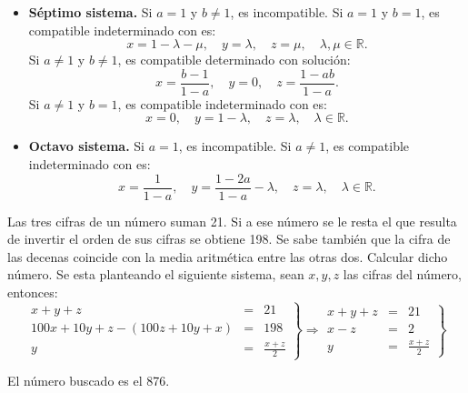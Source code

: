\begin{ejercicio}
\begin{itemize}
		\item \textbf{Séptimo sistema.} Si $a = 1$ y $b \neq 1$, es incompatible. Si $a = 1$ y $b = 1$, es compatible indeterminado con es:
		      \[
			      x = 1 - \lambda - \mu, \quad y = \lambda, \quad z = \mu, \quad \lambda, \mu \in \mathbb{R}.
		      \]
		      Si $a \neq 1$ y $b \neq 1$, es compatible determinado con solución:
		      \[
			      x = \frac{b - 1}{1 - a}, \quad y = 0, \quad z = \frac{1 - ab}{1 - a}.
		      \]
		      Si $a \neq 1$ y $b = 1$, es compatible indeterminado con es:
		      \[
			      x = 0, \quad y = 1 - \lambda, \quad z = \lambda, \quad \lambda \in \mathbb{R}.
		      \]

		\item \textbf{Octavo sistema.} Si $a = 1$, es incompatible. Si $a \neq 1$, es compatible indeterminado con es:
		      \[
			      x = \frac{1}{1 - a}, \quad y = \frac{1 - 2a}{1 - a} - \lambda, \quad z = \lambda, \quad \lambda \in \mathbb{R}.
		      \]
	\end{itemize}


\end{ejercicio}
\begin{ejercicio}
	Las tres cifras de un número suman 21. Si a ese número se le resta el que resulta de invertir el orden de sus cifras se obtiene 198. Se sabe también que la cifra de las decenas coincide con la media aritmética entre las otras dos. Calcular dicho número.
	Se esta planteando el siguiente sistema, sean $x, y, z$ las cifras del número, entonces:
	\begin{equation*}
		\left.
		\begin{array}{rcl}
			x + y + z                         & = & 21              \\
			100x + 10y + z - (100z + 10y + x) & = & 198             \\
			y                                 & = & \frac{x + z}{2}
		\end{array} \right\} \Rightarrow \left. \begin{array}{rcl}
			x + y + z & = & 21              \\
			x - z     & = & 2               \\
			y         & = & \frac{x + z}{2}
		\end{array} \right\}
	\end{equation*}

	{El número buscado es el 876.}

\end{ejercicio}
